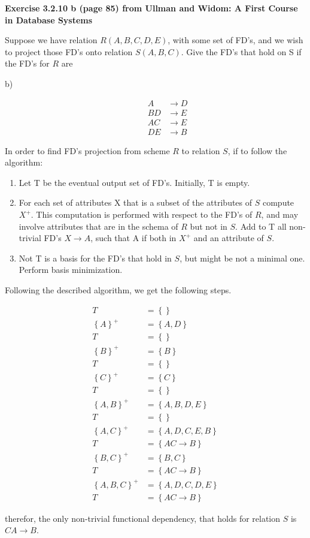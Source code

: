 \documentclass[a4paper]{article}
\newcommand{\set}[1]{\left\{#1\right\}}
\newcommand{\ra}{\rightarrow}
\newenvironment{problem}[1][\unskip]%
{\centering\textbf{ #1}%

\vspace{0.5cm}
\begin{em}}%
{\end{em}}
\newenvironment{answer}%
{\begin{framed}%
\vspace{0.5cm}}%
{\end{framed}\vspace{0.5cm}}
\begin{document}
	\newpage
	\begin{problem}[Exercise 3.2.10 b (page 85) from Ullman and Widom: A First Course in Database Systems]
		Suppose we have relation $R(A,B,C,D,E)$, with some set of FD's, and we wish to project those FD's onto relation $S(A,B,C)$. Give the FD's that hold on S if the FD's for $R$ are
		\begin{description}
			\item[b)]
			\begin{align*}
			 	A &\ra D \\
			 	BD &\ra E \\
			 	AC &\ra E \\
			 	DE &\ra B
			\end{align*} 
		\end{description}
	\end{problem}
	\begin{answer}
		In order to find FD's projection from scheme $R$ to relation $S$, if to follow the algorithm:
		\begin{enumerate}
			\item Let T be the eventual output set of FD's. Initially, T is empty.
			\item For each set of attributes X that is a subset of the attributes of $S$ compute $X^+$. This computation is performed with respect to the FD's of $R$, and may involve attributes that are in the schema of $R$ but not in $S$. Add to T all non-trivial FD's $X \ra A$, such that A if both in $X^+$ and an attribute of $S$.
			\item Not T is a basis for the FD's that hold in $S$, but might be not a minimal one. Perform basis minimization.
		\end{enumerate}

		Following the described algorithm, we get the following steps.

		\begin{align*}
			T &= \set{} \\
			\set{A}^+ &= \set{A,D} \\
			T &= \set{} \\
			\set{B}^+ &= \set{B} \\
			T &= \set{} \\
			\set{C}^+ &= \set{C} \\
			T &= \set{} \\
			\set{A,B}^+ &= \set{A,B,D,E} \\
			T &= \set{} \\ 
			\set {A,C}^+ &= \set{A,D,C,E,B} \\
			T &= \set{AC \ra B} \\
			\set{B,C}^+ &= \set{B,C} \\
			T &= \set{AC \ra B} \\
			\set{A,B,C}^+ &= \set{A,D,C,D,E} \\
			T &= \set{AC \ra B}
		\end{align*}

		therefor, the only non-trivial functional dependency, that holds for relation $S$ is $CA \ra B$.
	\end{answer}
	
\end{document}
